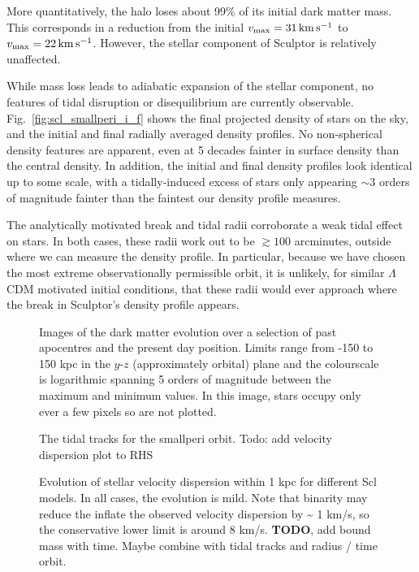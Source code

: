 More quantitatively, the halo loses about 99\% of its initial dark
matter mass. This corresponds in a reduction from the initial
\(v_{\rm max} = 31\,{\rm km\,s^{-1}}\) to \(v_{\rm max} = 22\,{\rm km\,s^{-1}}\). However, the
stellar component of Sculptor is relatively unaffected.

While mass loss leads to adiabatic expansion of the stellar component,
no features of tidal disruption or disequilibrium are currently
observable. Fig.~\ref{fig:scl_smallperi_i_f} shows the final projected
density of stars on the sky, and the initial and final radially averaged
density profiles. No non-spherical density features are apparent, even
at 5 decades fainter in surface density than the central density. In
addition, the initial and final density profiles look identical up to
some scale, with a tidally-induced excess of stars only appearing
\(\sim 3\) orders of magnitude fainter than the faintest our density
profile measures.

The analytically motivated break and tidal radii corroborate a weak
tidal effect on stars. In both cases, these radii work out to be
\(\gtrsim 100\) arcminutes, outside where we can measure the density
profile. In particular, because we have chosen the most extreme
observationally permissible orbit, it is unlikely, for similar
\(\Lambda\)CDM motivated initial conditions, that these radii would ever
approach where the break in Sculptor's density profile appears.

\begin{figure}
\centering
{}
\caption[Sculptor simulation snapshots]{Images of the dark matter
evolution over a selection of past apocentres and the present day
position. Limits range from -150 to 150 kpc in the \(y\)-\(z\)
(approximately orbital) plane and the colourscale is logarithmic
spanning 5 orders of magnitude between the maximum and minimum values.
In this image, stars occupy only ever a few pixels so are not
plotted.}\label{fig:scl_sim_images}
\end{figure}

\begin{figure}
\centering
{}
\caption[Sculptor Tidal Tracks]{The tidal tracks for the smallperi
orbit. Todo: add velocity dispersion plot to
RHS}\label{fig:scl_tidal_track}
\end{figure}

\begin{figure}
\centering
{}
\caption[Sculptor velocity dispersion evolution]{Evolution of stellar
velocity dispersion within 1 kpc for different Scl models. In all cases,
the evolution is mild. Note that binarity may reduce the inflate the
observed velocity dispersion by \textasciitilde{} 1 km/s, so the
conservative lower limit is around 8 km/s. \textbf{TODO}, add bound mass
with time. Maybe combine with tidal tracks and radius / time orbit.}
\end{figure}

